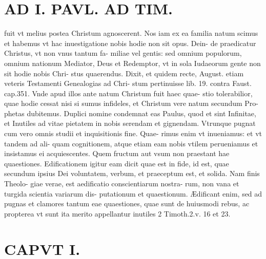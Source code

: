 \documentclass{article}
\begin{document}
\begin{pages}
\section*{AD I. PAVL. AD TIM. }
\marginpar{[ p.12 ]}\pstart fuit vt melius postea Christum agnoscerent. Nos iam ex ea familia natum scimus et habemus vt hac inuestigatione nobis hodie non sit opus. Dein- de praedicatur Christus, vt non vnus tantum fa- miliae vel gentis: sed omnium populorum, omnium nationum Mediator, Deus et Redemptor, vt in sola Iudaeorum gente non sit hodie nobis Chri- stus quaerendus. Dixit, et quidem recte, August. etiam veteris Testamenti Genealogias ad Chri- stum pertinuisse lib. 19. contra Faust. cap.351. Vnde apud illos ante natum Christum fuit haec quae- stio tolerabilior, quae hodie cessat nisi si sumus infideles, et Christum vere natum secundum Pro- phetas dubitemus. Duplici nomine condemnat eas Paulus, quod et sint Infinitae, et Inutiles ad vitae pietatem in nobis serendam et gignendam. Vtrunque pugnat cum vero omnis studii et inquisitionis fine. Quae- rimus enim vt inueniamus: et vt tandem ad ali- quam cognitionem, atque etiam eam nobis vtilem perueniamus et insistamus ei acquiescentes. Quem fructum aut vsum non praestant hae quaestiones. Edificationem igitur eam dicit quae est in fide, id est, quae secundum ipsius Dei voluntatem, verbum, et praeceptum est, et solida. Nam finis Theolo- giae verae, est aedificatio conscientiarum nostra- rum, non vana et turgida scientia variarum dis- putationum et quaestionum. Ædificant enim, sed ad pugnas et clamores tantum eae quaestiones, quae sunt de huiusmodi rebus, ac propterea vt sunt ita merito appellantur inutiles 2 Timoth.2.v. 16 et 23.  \pend
\section*{CAPVT  I. }
\marginpar{[ p.13 ]}\pstart {}
{}

\end{pages}
\end{document}
